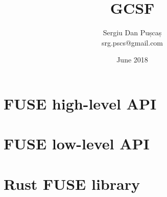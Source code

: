\documentclass[a4paper,12pt,titlepage,openany]{book}
\title{GCSF}
\author{Sergiu Dan Pușcaș \\ srg.pscs@gmail.com}
\date{June 2018}
\begin{document}

\maketitle
\tableofcontents







\begin{appendices}
\chapter{FUSE high-level API} \label{appendix:fuse_high_level}


\chapter{FUSE low-level API} \label{appendix:fuse_low_level}


\chapter{Rust FUSE library} \label{appendix:rust_fuse}

\end{appendices}



\end{document}
